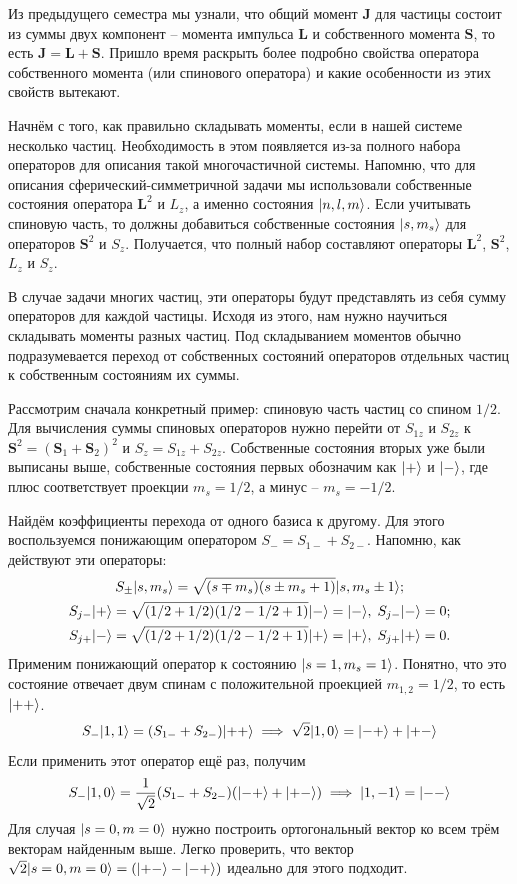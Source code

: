 Из предыдущего семестра мы узнали, что общий момент $\mathbf{J}$ для частицы
состоит из суммы двух компонент -- момента импульса $\mathbf{L}$ и собственного
момента $\mathbf{S}$, то есть $\mathbf{J} = \mathbf{L} + \mathbf{S}$. Пришло
время раскрыть более подробно свойства оператора собственного момента (или
спинового оператора) и какие особенности из этих свойств вытекают.

Начнём с того, как правильно складывать моменты, если в нашей системе несколько
частиц. Необходимость в этом появляется из-за полного набора операторов для
описания такой многочастичной системы. Напомню, что для описания
сферический-симметричной задачи мы использовали собственные состояния оператора
$\mathbf{L}^2$ и $L_z$, а именно состояния $\lvert n,l,m\rangle$. Если учитывать
спиновую часть, то должны добавиться собственные состояния $\lvert s, m_s\rangle$ для
операторов $\mathbf{S}^2$ и $S_z$. Получается, что полный набор составляют
операторы $\mathbf{L}^2$, $\mathbf{S}^2$, $L_z$ и $S_z$.

В случае задачи многих частиц, эти операторы будут представлять из себя сумму
операторов для каждой частицы. Исходя из этого, нам нужно научиться складывать
моменты разных частиц. Под складыванием моментов обычно подразумевается переход
от собственных состояний операторов отдельных частиц к собственным состояниям
их суммы.

Рассмотрим сначала конкретный пример: спиновую часть частиц со спином $1/2$.
Для вычисления суммы спиновых операторов нужно перейти от $S_{1z}$ и $S_{2z}$ к
$\mathbf{S}^2 = (\mathbf{S}_1 + \mathbf{S}_2)^2$ и $S_z = S_{1z} + S_{2z}$.
Собственные состояния вторых уже были выписаны выше, собственные состояния
первых обозначим как $\lvert+\rangle$ и $\lvert-\rangle$, где плюс соответствует проекции
$m_s = 1/2$, а минус -- $m_s = -1/2$.

Найдём коэффициенты перехода от одного базиса к другому. Для этого
воспользуемся понижающим оператором $S_- = S_{1-} + S_{2-}$. Напомню, как
действуют эти операторы:
\begin{gather*}
  S_{\pm}\lvert s, m_s\rangle = \sqrt{(s\mp m_s)(s\pm m_s + 1)}\lvert s, m_s \pm 1\rangle; \\
  S_{j-}\lvert+\rangle = \sqrt{(1/2+1/2)(1/2 - 1/2 + 1)}\lvert-\rangle = \lvert-\rangle,\; S_{j-}\lvert-\rangle = 0;\\
  S_{j+}\lvert-\rangle = \sqrt{(1/2 + 1/2)(1/2 - 1/2 + 1)}\lvert+\rangle = \lvert+\rangle,\; S_{j+}\lvert+\rangle = 0.
\end{gather*}
Применим понижающий оператор к состоянию $\lvert s=1, m_s=1\rangle$. Понятно, что это
состояние отвечает двум спинам с положительной проекцией $m_{1,2} = 1/2$, то
есть $\lvert++\rangle$.
\[
  S_- \lvert1, 1\rangle = (S_{1-} + S_{2-})\lvert++\rangle\implies \sqrt{2}\lvert1, 0\rangle = \lvert-+\rangle + \lvert+-\rangle
\]
Если применить этот оператор ещё раз, получим
\[
  S_- \lvert1, 0\rangle = \frac{1}{\sqrt{2}}(S_{1-} + S_{2-})(\lvert-+\rangle+\lvert+-\rangle)\implies \lvert1, -1\rangle = \lvert--\rangle
\]
Для случая $\lvert s=0, m=0\rangle$ нужно построить ортогональный вектор ко всем трём
векторам найденным выше. Легко проверить, что вектор $\sqrt{2}\lvert s=0, m=0\rangle =
  (\lvert+-\rangle - \lvert-+\rangle)$ идеально для этого подходит.

